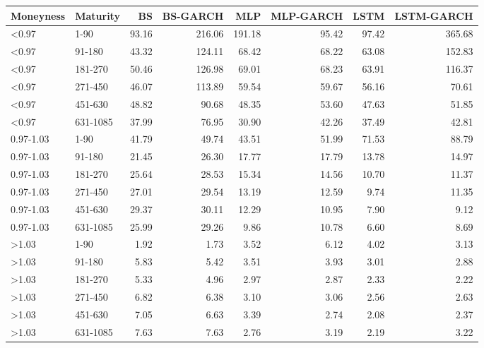 \begin{tabular}{llrrrrrr}
\toprule
Moneyness & Maturity & BS & BS-GARCH & MLP & MLP-GARCH & LSTM & LSTM-GARCH \\
\midrule
<0.97 & 1-90 & 93.16 & 216.06 & 191.18 & 95.42 & 97.42 & 365.68 \\
<0.97 & 91-180 & 43.32 & 124.11 & 68.42 & 68.22 & 63.08 & 152.83 \\
<0.97 & 181-270 & 50.46 & 126.98 & 69.01 & 68.23 & 63.91 & 116.37 \\
<0.97 & 271-450 & 46.07 & 113.89 & 59.54 & 59.67 & 56.16 & 70.61 \\
<0.97 & 451-630 & 48.82 & 90.68 & 48.35 & 53.60 & 47.63 & 51.85 \\
<0.97 & 631-1085 & 37.99 & 76.95 & 30.90 & 42.26 & 37.49 & 42.81 \\
0.97-1.03 & 1-90 & 41.79 & 49.74 & 43.51 & 51.99 & 71.53 & 88.79 \\
0.97-1.03 & 91-180 & 21.45 & 26.30 & 17.77 & 17.79 & 13.78 & 14.97 \\
0.97-1.03 & 181-270 & 25.64 & 28.53 & 15.34 & 14.56 & 10.70 & 11.37 \\
0.97-1.03 & 271-450 & 27.01 & 29.54 & 13.19 & 12.59 & 9.74 & 11.35 \\
0.97-1.03 & 451-630 & 29.37 & 30.11 & 12.29 & 10.95 & 7.90 & 9.12 \\
0.97-1.03 & 631-1085 & 25.99 & 29.26 & 9.86 & 10.78 & 6.60 & 8.69 \\
>1.03 & 1-90 & 1.92 & 1.73 & 3.52 & 6.12 & 4.02 & 3.13 \\
>1.03 & 91-180 & 5.83 & 5.42 & 3.51 & 3.93 & 3.01 & 2.88 \\
>1.03 & 181-270 & 5.33 & 4.96 & 2.97 & 2.87 & 2.33 & 2.22 \\
>1.03 & 271-450 & 6.82 & 6.38 & 3.10 & 3.06 & 2.56 & 2.63 \\
>1.03 & 451-630 & 7.05 & 6.63 & 3.39 & 2.74 & 2.08 & 2.37 \\
>1.03 & 631-1085 & 7.63 & 7.63 & 2.76 & 3.19 & 2.19 & 3.22 \\
\bottomrule
\end{tabular}
